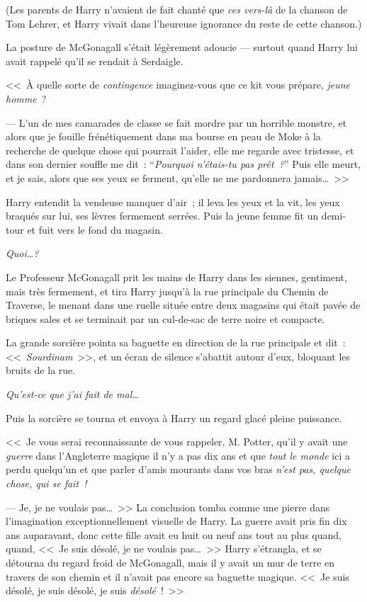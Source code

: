 (Les parents de Harry n'avaient de fait chanté que \emph{ces vers-là} de la chanson de Tom Lehrer, et Harry vivait dans l'heureuse ignorance du reste de cette chanson.)

La posture de McGonagall s'était légèrement adoucie — surtout quand Harry lui avait rappelé qu'il se rendait à Serdaigle.

<<~À quelle sorte de \emph{contingence} imaginez-vous que ce kit vous prépare, \emph{jeune homme}~?

--- L'un de mes camarades de classe se fait mordre par un horrible monstre, et alors que je fouille frénétiquement dans ma bourse en peau de Moke à la recherche de quelque chose qui pourrait l'aider, elle me regarde avec tristesse, et dans son dernier souffle me dit~: “\emph{Pourquoi n'étais-tu pas prêt~?}” Puis elle meurt, et je sais, alors que ses yeux se ferment, qu'elle ne me pardonnera jamais…~>>

Harry entendit la vendeuse manquer d'air~; il leva les yeux et la vit, les yeux braqués sur lui, ses lèvres fermement serrées. Puis la jeune femme fit un demi-tour et fuit vers le fond du magasin.

\emph{Quoi…?}

Le Professeur McGonagall prit les mains de Harry dans les siennes, gentiment, mais très fermement, et tira Harry jusqu'à la rue principale du Chemin de Traverse, le menant dans une ruelle située entre deux magasins qui était pavée de briques sales et se terminait par un cul-de-sac de terre noire et compacte.

La grande sorcière pointa sa baguette en direction de la rue principale et dit~: <<~\emph{Sourdinam}~>>, et un écran de silence s'abattit autour d'eux, bloquant les bruits de la rue.

\emph{Qu'est-ce que j'ai fait de mal…}

Puis la sorcière se tourna et envoya à Harry un regard glacé pleine puissance.

<<~Je vous serai reconnaissante de vous rappeler, M. Potter, qu'il y avait une \emph{guerre} dans l'Angleterre magique il n'y a pas dix ans et que \emph{tout le monde} ici a perdu quelqu'un et que parler d'amis mourants dans vos bras \emph{n'est pas, quelque chose, qui se fait~!}

--- Je, je ne voulais pas…~>> La conclusion tomba comme une pierre dans l'imagination exceptionnellement visuelle de Harry. La guerre avait pris fin dix ans auparavant, donc cette fille avait eu huit ou neuf ans tout au plus quand, quand, <<~Je suis désolé, je ne voulais pas…~>> Harry s'étrangla, et se détourna du regard froid de McGonagall, mais il y avait un mur de terre en travers de son chemin et il n'avait pas encore sa baguette magique. <<~Je suis désolé, je suis désolé, je suis \emph{désolé}~!~>>


